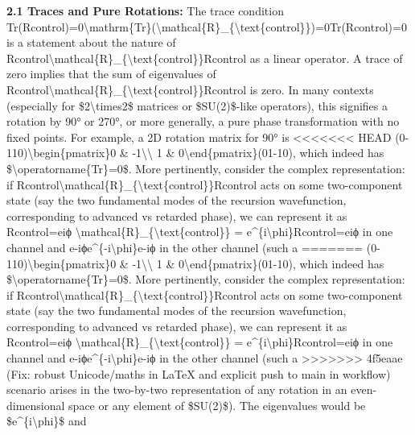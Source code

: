 \documentclass[]{article}
\begin{document}
{\textbf{2.1 Traces and Pure Rotations:} The trace condition
Tr(Rcontrol)=0\textbackslash{}mathrm\{Tr\}(\textbackslash{}mathcal\{R\}\_\{\textbackslash{}text\{control\}\})=0Tr(Rcontrol​)=0
is a statement about the nature of
Rcontrol\textbackslash{}mathcal\{R\}\_\{\textbackslash{}text\{control\}\}Rcontrol​
as a linear operator. A trace of zero implies that the sum of
eigenvalues of
Rcontrol\textbackslash{}mathcal\{R\}\_\{\textbackslash{}text\{control\}\}Rcontrol​
is zero. In many contexts (especially for \$2\textbackslash{}times2\$
matrices or \$SU(2)\$-like operators), this signifies a rotation by 90°
or 270°, or more generally, a pure phase transformation with no fixed
points. For example, a 2D rotation matrix for 90° is
<<<<<<< HEAD
(0-110)\textbackslash begin\{pmatrix\}0 \&
-1\textbackslash\textbackslash{} 1 \&
0\textbackslash end\{pmatrix\}(01\hspace{0pt}-10\hspace{0pt}), which
indeed has \$\textbackslash operatorname\{Tr\}=0\$. More pertinently,
consider the complex representation: if
Rcontrol\textbackslash mathcal\{R\}\_\{\textbackslash text\{control\}\}Rcontrol\hspace{0pt}
acts on some two-component state (say the two fundamental modes of the
recursion wavefunction, corresponding to advanced vs retarded phase), we
can represent it as Rcontrol=eiϕ
\textbackslash mathcal\{R\}\_\{\textbackslash text\{control\}\} =
e\^{}\{i\textbackslash phi\}Rcontrol\hspace{0pt}=eiϕ in one channel and
e-iϕe\^{}\{-i\textbackslash phi\}e-iϕ in the other channel (such a
=======
(0-110)\textbackslash{}begin\{pmatrix\}0 \&
-1\textbackslash{}\textbackslash{} 1 \&
0\textbackslash{}end\{pmatrix\}(01​-10​), which indeed has
\$\textbackslash{}operatorname\{Tr\}=0\$. More pertinently, consider the
complex representation: if
Rcontrol\textbackslash{}mathcal\{R\}\_\{\textbackslash{}text\{control\}\}Rcontrol​
acts on some two-component state (say the two fundamental modes of the
recursion wavefunction, corresponding to advanced vs retarded phase), we
can represent it as Rcontrol=eiϕ
\textbackslash{}mathcal\{R\}\_\{\textbackslash{}text\{control\}\} =
e\^{}\{i\textbackslash{}phi\}Rcontrol​=eiϕ in one channel and
e-iϕe\^{}\{-i\textbackslash{}phi\}e-iϕ in the other channel (such a
>>>>>>> 4f5eaae (Fix: robust Unicode/maths in LaTeX and explicit push to main in workflow)
scenario arises in the two-by-two representation of any rotation in an
even-dimensional space or any element of \$SU(2)\$). The eigenvalues
would be \$e\^{}\{i\textbackslash{}phi\}\$ and
}
\end{document}

